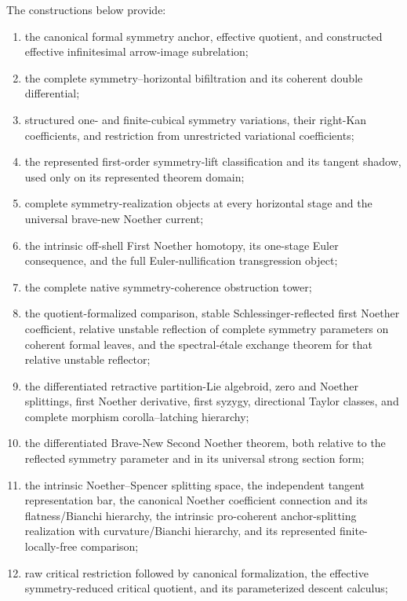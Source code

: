 The constructions below provide:
\begin{enumerate}
\item the canonical formal symmetry anchor, effective quotient, and constructed
      effective infinitesimal arrow-image subrelation;
\item the complete symmetry--horizontal bifiltration and its coherent double
      differential;
\item structured one- and finite-cubical symmetry variations, their right-Kan
      coefficients, and restriction from unrestricted variational coefficients;
\item the represented first-order symmetry-lift classification and its tangent
      shadow, used only on its represented theorem domain;
\item complete symmetry-realization objects at every horizontal stage and the
      universal brave-new Noether current;
\item the intrinsic off-shell First Noether homotopy, its one-stage Euler
      consequence, and the full Euler-nullification transgression object;
\item the complete native symmetry-coherence obstruction tower;
\item the quotient-formalized comparison, stable Schlessinger-reflected first
      Noether coefficient, relative unstable reflection of complete symmetry
      parameters on coherent formal leaves, and the spectral-\'etale exchange theorem
      for that relative unstable reflector;
\item the differentiated retractive partition-Lie algebroid, zero and Noether
      splittings, first Noether derivative, first syzygy, directional Taylor
      classes, and complete morphism corolla--latching hierarchy;
\item the differentiated Brave-New Second Noether theorem, both relative to the
      reflected symmetry parameter and in its universal strong section form;
\item the intrinsic Noether--Spencer splitting space, the independent tangent
      representation bar, the canonical Noether coefficient connection and its
      flatness/Bianchi hierarchy, the intrinsic pro-coherent anchor-splitting
      realization with curvature/Bianchi hierarchy, and its represented
      finite-locally-free comparison;
\item raw critical restriction followed by canonical formalization, the effective
      symmetry-reduced critical quotient, and its parameterized descent calculus;

\end{enumerate}
